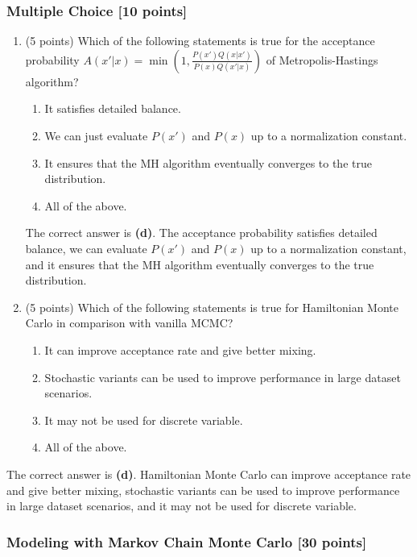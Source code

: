 \documentclass{article}
\begin{document}
\subsubsection{Multiple Choice [10 points]}
\begin{enumerate}
\item (5 points) Which of the following statements is true for the acceptance probability
$A(x'|x) = \min(1, \frac{P(x')Q(x|x')}{P(x)Q(x'|x)})$ of Metropolis-Hastings algorithm?
\begin{enumerate}
\item It satisfies detailed balance.
\item We can just evaluate $P(x')$ and $P(x)$ up to a normalization constant.
\item It ensures that the MH algorithm eventually converges to the true distribution.
\item All of the above.
\end{enumerate}

The correct answer is \textbf{(d)}. The acceptance probability satisfies detailed balance, we can evaluate $P(x')$ and $P(x)$ up to a normalization constant, and it ensures that the MH algorithm eventually converges to the true distribution.

\item (5 points) Which of the following statements is true for Hamiltonian Monte Carlo in comparison with
vanilla MCMC?
\begin{enumerate}
\item It can improve acceptance rate and give better mixing.
\item Stochastic variants can be used to improve performance in large dataset scenarios.
\item It may not be used for discrete variable.
\item All of the above.
\end{enumerate}
\end{enumerate}

The correct answer is \textbf{(d)}. Hamiltonian Monte Carlo can improve acceptance rate and give better mixing, stochastic variants can be used to improve performance in large dataset scenarios, and it may not be used for discrete variable.

\subsubsection{Modeling with Markov Chain Monte Carlo [30 points]}
\end{document}
